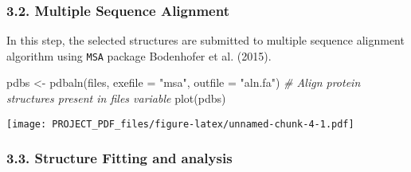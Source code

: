 \documentclass[
]{article}
\newenvironment{Shaded}{\begin{snugshade}}{\end{snugshade}}
\newcommand{\AttributeTok}[1]{\textcolor[rgb]{0.77,0.63,0.00}{#1}}
\newcommand{\CommentTok}[1]{\textcolor[rgb]{0.56,0.35,0.01}{\textit{#1}}}
\newcommand{\ConstantTok}[1]{\textcolor[rgb]{0.00,0.00,0.00}{#1}}
\newcommand{\DecValTok}[1]{\textcolor[rgb]{0.00,0.00,0.81}{#1}}
\newcommand{\FunctionTok}[1]{\textcolor[rgb]{0.00,0.00,0.00}{#1}}
\newcommand{\NormalTok}[1]{#1}
\newcommand{\OtherTok}[1]{\textcolor[rgb]{0.56,0.35,0.01}{#1}}
\newcommand{\SpecialCharTok}[1]{\textcolor[rgb]{0.00,0.00,0.00}{#1}}
\newcommand{\StringTok}[1]{\textcolor[rgb]{0.31,0.60,0.02}{#1}}
\begin{document}
\begin{Shaded}
\end{Shaded}

\hypertarget{multiple-sequence-alignment}{%
\subsubsection{3.2. Multiple Sequence
Alignment}\label{multiple-sequence-alignment}}

In this step, the selected structures are submitted to multiple sequence
alignment algorithm using \texttt{MSA} package Bodenhofer et al. (2015).

\begin{Shaded}
\begin{Highlighting}[]
\NormalTok{pdbs }\OtherTok{\textless{}{-}} \FunctionTok{pdbaln}\NormalTok{(files, }\AttributeTok{exefile =} \StringTok{"msa"}\NormalTok{, }\AttributeTok{outfile =} \StringTok{"aln.fa"}\NormalTok{) }\CommentTok{\# Align protein structures present in files variable}
\FunctionTok{plot}\NormalTok{(pdbs)}
\end{Highlighting}
\end{Shaded}

\texttt{[image: PROJECT\_PDF\_files/figure-latex/unnamed-chunk-4-1.pdf]}

\hypertarget{structure-fitting-and-analysis}{%
\subsubsection{3.3. Structure Fitting and
analysis}\label{structure-fitting-and-analysis}}
\end{document}
